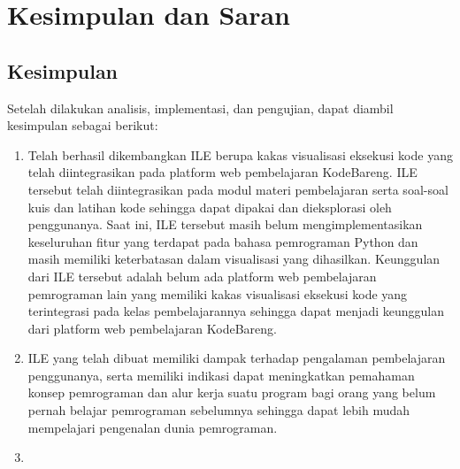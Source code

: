 \chapter{Kesimpulan dan Saran}


\section{Kesimpulan}
Setelah dilakukan analisis, implementasi, dan pengujian, dapat diambil kesimpulan sebagai berikut:
\begin{enumerate}
  \item Telah berhasil dikembangkan ILE berupa kakas visualisasi eksekusi kode yang telah diintegrasikan pada platform web pembelajaran KodeBareng. ILE tersebut telah diintegrasikan pada modul materi pembelajaran serta soal-soal kuis dan latihan kode sehingga dapat dipakai dan dieksplorasi oleh penggunanya. Saat ini, ILE tersebut masih belum mengimplementasikan keseluruhan fitur yang terdapat pada bahasa pemrograman Python dan masih memiliki keterbatasan dalam visualisasi yang dihasilkan. Keunggulan dari ILE tersebut adalah belum ada platform web pembelajaran pemrograman lain yang memiliki kakas visualisasi eksekusi kode yang terintegrasi pada kelas pembelajarannya sehingga dapat menjadi keunggulan dari platform web pembelajaran KodeBareng.
  \item ILE yang telah dibuat memiliki dampak terhadap pengalaman pembelajaran penggunanya, serta memiliki indikasi dapat meningkatkan pemahaman konsep pemrograman dan alur kerja suatu program bagi orang yang belum pernah belajar pemrograman sebelumnya sehingga dapat lebih mudah mempelajari pengenalan dunia pemrograman.
  \item
\end{enumerate}


